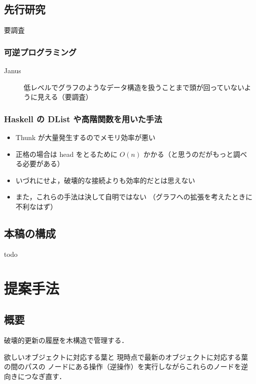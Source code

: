 \documentclass[10pt, a4j, twocolumn]{scrartcl}
\begin{document}
\subsection{先行研究}
\label{sec:orge618ee6}

要調査

\subsubsection{可逆プログラミング}
\label{sec:orgf7f9f1f}
\begin{description}
\item[{Janus}] 低レベルでグラフのようなデータ構造を扱うことまで頭が回っていないように見える（要調査）
\end{description}


\subsubsection{Haskell の DList や高階関数を用いた手法}
\label{sec:org0de8379}
\begin{itemize}
\item Thunk が大量発生するのでメモリ効率が悪い
\item 正格の場合は head をとるために \(O(n)\) かかる（と思うのだがもっと調べる必要がある）
\item いづれにせよ，破壊的な接続よりも効率的だとは思えない
\item また，これらの手法は決して自明ではない
（グラフへの拡張を考えたときに不利なはず）
\end{itemize}


\subsection{本稿の構成}
\label{sec:org375e4e3}

todo


\section{提案手法}
\label{sec:org8dd0275}

\subsection{概要}
\label{sec:org7cfed74}

破壊的更新の履歴を木構造で管理する．

欲しいオブジェクトに対応する葉と
現時点で最新のオブジェクトに対応する葉の間のパスの
ノードにある操作（逆操作）を実行しながらこれらのノードを逆向きにつなぎ直す．
\end{document}
